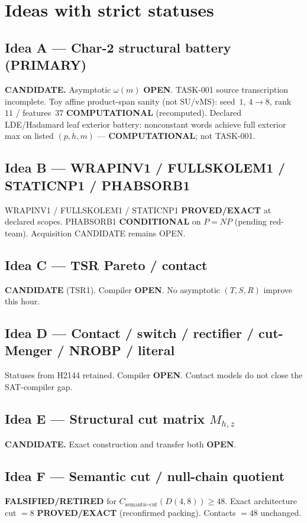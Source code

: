 \documentclass[11pt]{article}
\begin{document}
\section*{Ideas with strict statuses}
\subsection*{Idea A --- Char-2 structural battery (PRIMARY)}
\textbf{CANDIDATE.} Asymptotic $\omega(m)$ \textbf{OPEN}. TASK-001 source transcription incomplete.
Toy affine product-span sanity (not SU/vMS): seed~$1$, $4\to8$, rank~$11$ / features~$37$
\textbf{COMPUTATIONAL} (recomputed).
Declared LDE/Hadamard leaf exterior battery: nonconstant words achieve full exterior max on
listed $(p,h,m)$ --- \textbf{COMPUTATIONAL}; not TASK-001.

\subsection*{Idea B --- WRAPINV1 / FULLSKOLEM1 / STATICNP1 / PHABSORB1}
WRAPINV1 / FULLSKOLEM1 / STATICNP1 \textbf{PROVED/EXACT} at declared scopes.
PHABSORB1 \textbf{CONDITIONAL} on $P=NP$ (pending red-team). Acquisition CANDIDATE remains OPEN.

\subsection*{Idea C --- TSR Pareto / contact}
\textbf{CANDIDATE} (TSR1). Compiler \textbf{OPEN}. No asymptotic $(T,S,R)$ improve this hour.

\subsection*{Idea D --- Contact / switch / rectifier / cut-Menger / NROBP / literal}
Statuses from H2144 retained. Compiler \textbf{OPEN}. Contact models do not close the SAT-compiler gap.

\subsection*{Idea E --- Structural cut matrix $M_{h,z}$}
\textbf{CANDIDATE.} Exact construction and transfer both \textbf{OPEN}.

\subsection*{Idea F --- Semantic cut / null-chain quotient}
\textbf{FALSIFIED/RETIRED} for $C_{\mathrm{semantic\textrm{-}cut}}(D(4,8))\ge48$.
Exact architecture cut $=8$ \textbf{PROVED/EXACT} (reconfirmed packing). Contacts $=48$ unchanged.
\end{document}
